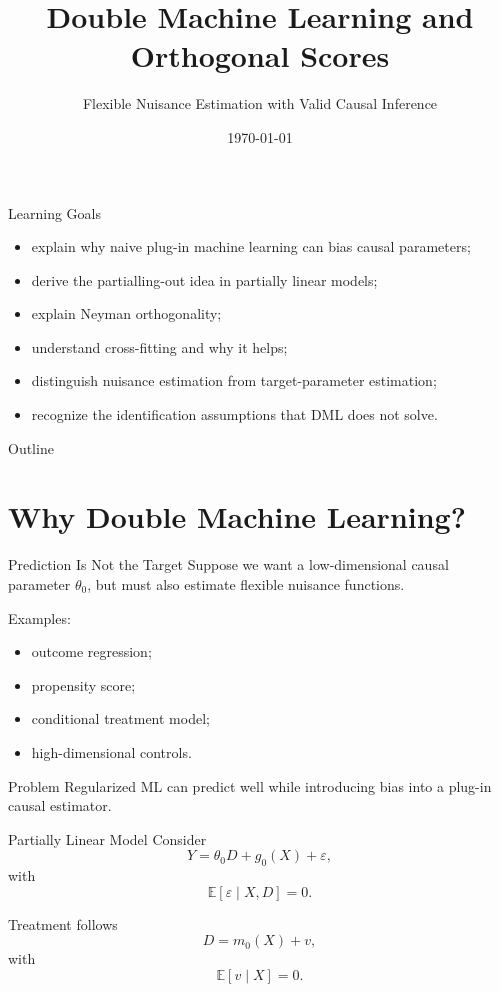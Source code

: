 \documentclass[aspectratio=169,11pt]{beamer}
\title[Double Machine Learning]{Double Machine Learning and Orthogonal Scores}
\subtitle{Flexible Nuisance Estimation with Valid Causal Inference}
\date{\today}
\newcommand{\E}{\mathbb{E}}
\begin{document}
\begin{frame}
\titlepage
\end{frame}

\begin{frame}{Learning Goals}
\begin{itemize}
\item explain why naive plug-in machine learning can bias causal parameters;
\item derive the partialling-out idea in partially linear models;
\item explain Neyman orthogonality;
\item understand cross-fitting and why it helps;
\item distinguish nuisance estimation from target-parameter estimation;
\item recognize the identification assumptions that DML does not solve.
\end{itemize}
\end{frame}

\begin{frame}{Outline}
\tableofcontents
\end{frame}

\section{Why Double Machine Learning?}

\begin{frame}{Prediction Is Not the Target}
Suppose we want a low-dimensional causal parameter \(\theta_0\), but must also estimate flexible nuisance functions.

Examples:
\begin{itemize}
\item outcome regression;
\item propensity score;
\item conditional treatment model;
\item high-dimensional controls.
\end{itemize}

\begin{alertblock}{Problem}
Regularized ML can predict well while introducing bias into a plug-in causal estimator.
\end{alertblock}
\end{frame}

\begin{frame}{Partially Linear Model}
Consider
\[
Y = \theta_0 D + g_0(X) + \varepsilon,
\]
with
\[
\E[\varepsilon\mid X,D]=0.
\]

Treatment follows
\[
D = m_0(X)+v,
\]
with
\[
\E[v\mid X]=0.
\]
\end{frame}
\end{document}
